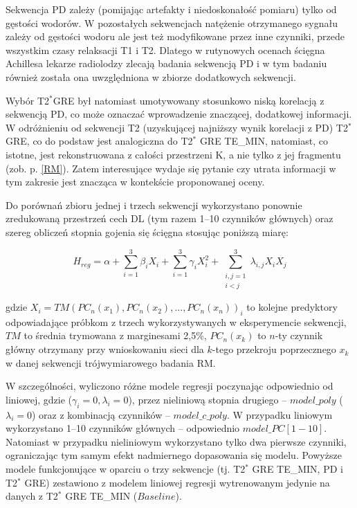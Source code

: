 Sekwencja PD zależy (pomijając artefakty i niedoskonałość pomiaru) tylko od gęstości wodorów. 
W pozostałych sekwencjach natężenie otrzymanego sygnału zależy od gęstości wodoru ale jest też modyfikowane przez inne czynniki, przede wszystkim czasy relaksacji T1 i T2. Dlatego w rutynowych ocenach ścięgna Achillesa lekarze radiolodzy zlecają badania sekwencją PD i w tym badaniu również została ona uwzględniona w zbiorze dodatkowych sekwencji.

Wybór T2$^\ast$GRE był natomiast umotywowany stosunkowo niską korelacją z sekwencją PD, co może oznaczać wprowadzenie znaczącej, dodatkowej informacji. W odróżnieniu od sekwencji T2 (uzyskującej najniższy wynik korelacji z PD) T2$^\ast$GRE, co do podstaw jest analogiczna do T2$^\ast$ GRE TE\_MIN, natomiast, co istotne, jest rekonstruowana z całości przestrzeni K, a nie tylko z jej fragmentu (zob. p. \ref{RM}). Zatem interesujące wydaje się pytanie czy utrata informacji w tym zakresie jest znacząca w kontekście proponowanej oceny. 

Do porównań zbioru jednej i trzech sekwencji wykorzystano ponownie zredukowaną przestrzeń cech DL (tym razem 1--10 czynników głównych) oraz szereg obliczeń stopnia gojenia się ścięgna stosując poniższą miarę: 

\begin{equation}
H_{reg} = \alpha + \sum_{i=1}^{3}\beta_{i}X_{i} + \sum_{i=1}^{3}\gamma_{i}X_{i}^{2} +
\sum_{\substack{i, j = 1\\ i < j}}^{3}\lambda_{i,j}X_{i}X_{j}
\end{equation}

gdzie $X_i = TM(PC_n(x_1), PC_n(x_2),..., PC_n(x_n))_{i}$ to kolejne predyktory odpowiadające próbkom z trzech wykorzystywanych w eksperymencie sekwencji, $TM$ \linebreak to średnia trymowana z marginesami 2,5\%, $PC_n(x_k)$ to $n$-ty czynnik główny otrzymany przy wnioskowaniu sieci dla $k$-tego przekroju poprzecznego $x_k$ w danej sekwencji trójwymiarowego badania RM.

W szczególności, wyliczono różne modele regresji poczynając odpowiednio od liniowej, gdzie ($\gamma_{i}=0, \lambda_{i}=0$), przez nieliniową stopnia drugiego -- $model\_poly$ ($\lambda_{i}=0$) oraz z kombinacją czynników -- $model\_c\_poly$. W przypadku liniowym wykorzystano 1--10 czynników głównych -- odpowiednio $model\_PC[1-10]$. Natomiast w przypadku nieliniowym wykorzystano tylko dwa pierwsze czynniki, ograniczając tym samym efekt nadmiernego dopasowania się modelu. Powyższe modele funkcjonujące w oparciu o trzy sekwencje (tj. T2$^\ast$ GRE TE\_MIN, PD i T2$^\ast$ GRE) zestawiono z modelem liniowej regresji wytrenowanym jedynie na danych z T2$^\ast$ GRE TE\_MIN ($Baseline$). 

